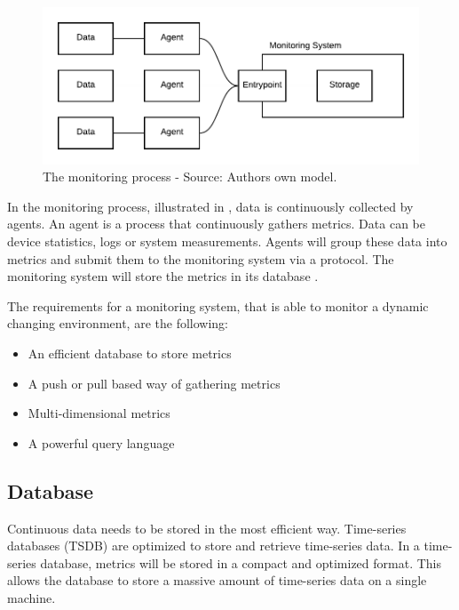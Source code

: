 \begin{figure}[h]
\centering
\includegraphics[scale=0.9]{images/02_theoretical_foundation/monitoring/monitoring_system}
\caption{The monitoring process - Source: Authors own model.}
\label{fig:mon_mon-system-process}
\end{figure}
In the monitoring process, illustrated in , data is continuously collected by agents. An agent is a process that continuously gathers metrics. Data can be device statistics, logs or system measurements. Agents will group these data into metrics and submit them to the monitoring system via a protocol. The monitoring system will store the metrics in its database \cite{Ligus2012EffMonitoring}.


The requirements for a monitoring system, that is able to monitor a dynamic changing environment, are the following:
\begin{itemize}
\item An efficient database to store metrics
\item A push or pull based way of gathering metrics \cite{Farcic2017Toolkit21}
\item Multi-dimensional metrics \cite{Farcic2017Toolkit21}
\item A powerful query language \cite{Farcic2017Toolkit21}
\end{itemize}


\subsection{Database}
Continuous data needs to be stored in the most efficient way.
Time-series databases (TSDB) are optimized to store and retrieve time-series data.
In a time-series database, metrics will be stored in a compact and optimized format. This allows the database to store a massive amount of time-series data on a single machine.


